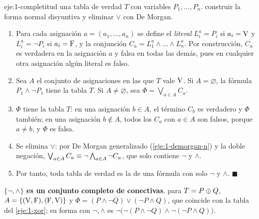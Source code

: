 \begin{solucion}{eje:1-completitud}
\datos una tabla de verdad $T$ con variables $P_1,\dots,P_n$.
\planteamiento construir la forma normal disyuntiva y eliminar $\vee$ con De Morgan.
\pasos
\begin{enumerate}[label=\arabic*.]
  \item Para cada asignación $a=(a_1,\dots,a_n)$ se define el \emph{literal} $L_i^{a}=P_i$ si $a_i=\mathrm{V}$ y $L_i^{a}=\neg P_i$ si $a_i=\mathrm{F}$, y la conjunción $C_a=L_1^{a}\wedge\dots\wedge L_n^{a}$. Por construcción, $C_a$ es verdadera en la asignación $a$ y falsa en todas las demás, pues en cualquier otra asignación algún literal es falso.
  \item Sea $A$ el conjunto de asignaciones en las que $T$ vale $\mathrm{V}$. Si $A=\varnothing$, la fórmula $P_1\wedge\neg P_1$ tiene la tabla $T$. Si $A\neq\varnothing$, sea $\Phi=\bigvee_{a\in A}C_a$.
  \item $\Phi$ tiene la tabla $T$: en una asignación $b\in A$, el término $C_b$ es verdadero y $\Phi$ también; en una asignación $b\notin A$, todos los $C_a$ con $a\in A$ son falsos, porque $a\neq b$, y $\Phi$ es falsa.
  \item Se elimina $\vee$: por De Morgan generalizado (\cref{eje:1-demorgan-n}) y la doble negación, $\bigvee_{a\in A}C_a\equiv\neg\bigwedge_{a\in A}\neg C_a$, que solo contiene $\neg$ y $\wedge$.
  \item Por tanto, toda tabla de verdad es la de una fórmula con solo $\neg$ y $\wedge$. $\blacksquare$
\end{enumerate}
\resultado \textbf{$\{\neg,\wedge\}$ es un conjunto completo de conectivas}.
\comprobacion para $T=P\oplus Q$, $A=\{(\mathrm{V},\mathrm{F}),(\mathrm{F},\mathrm{V})\}$ y $\Phi=(P\wedge\neg Q)\vee(\neg P\wedge Q)$, que coincide con la tabla del \cref{eje:1-xor}; su forma con $\neg,\wedge$ es $\neg\bigl(\neg(P\wedge\neg Q)\wedge\neg(\neg P\wedge Q)\bigr)$.
\end{solucion}

